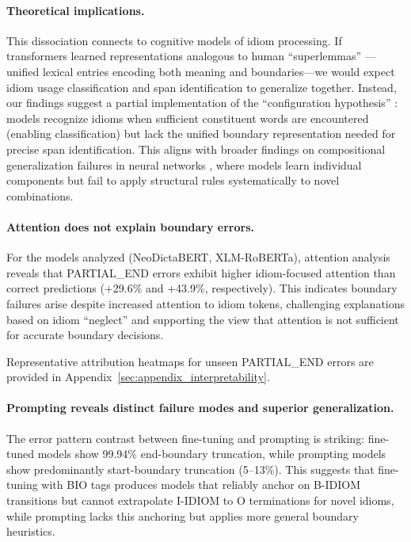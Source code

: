 \documentclass[11pt]{article}
\begin{document}
\paragraph{Theoretical implications.}
This dissociation connects to cognitive models of idiom processing. If transformers learned representations analogous to human ``superlemmas'' \citep{sprenger2006lexical}---unified lexical entries encoding both meaning and boundaries---we would expect idiom usage classification and span identification to generalize together. Instead, our findings suggest a partial implementation of the ``configuration hypothesis'' \citep{cacciari1988comprehension}: models recognize idioms when sufficient constituent words are encountered (enabling classification) but lack the unified boundary representation needed for precise span identification. This aligns with broader findings on compositional generalization failures in neural networks \citep{lake2018generalization,kim2020cogs}, where models learn individual components but fail to apply structural rules systematically to novel combinations.

\paragraph{Attention does not explain boundary errors.}
For the models analyzed (NeoDictaBERT, XLM-RoBERTa), attention analysis reveals that PARTIAL\_END errors exhibit higher idiom-focused attention than correct predictions (+29.6\% and +43.9\%, respectively). This indicates boundary failures arise despite increased attention to idiom tokens, challenging explanations based on idiom ``neglect'' and supporting the view that attention is not sufficient for accurate boundary decisions.

Representative attribution heatmaps for unseen PARTIAL\_END errors are provided in Appendix~\ref{sec:appendix_interpretability}.

\paragraph{Prompting reveals distinct failure modes and superior generalization.}
The error pattern contrast between fine-tuning and prompting is striking: fine-tuned models show 99.94\% end-boundary truncation, while prompting models show predominantly start-boundary truncation (5--13\%). This suggests that fine-tuning with BIO tags produces models that reliably anchor on B-IDIOM transitions but cannot extrapolate I-IDIOM to O terminations for novel idioms, while prompting lacks this anchoring but applies more general boundary heuristics.
\end{document}
